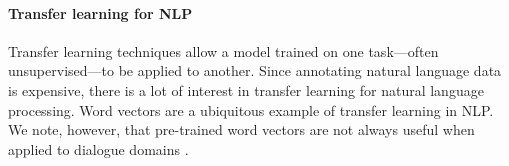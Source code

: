 \documentclass[11pt,a4paper]{article}
\begin{document}

\paragraph{Transfer learning for NLP}
Transfer learning techniques allow a model trained on one task---often unsupervised---to be applied to another. 
Since annotating natural language data is expensive, there is a lot of interest in transfer learning for natural language processing. 
Word vectors \citep[e.g.,][]{mikolovDistributedRepresentationsWords2013,penningtonGloveGlobalVectors2014} are a ubiquitous example of transfer learning in NLP.
We note, however, that pre-trained word vectors are not always useful when applied to dialogue domains \citet{cerisaraEffectsUsingWord2vec2017}. 
\end{document}
